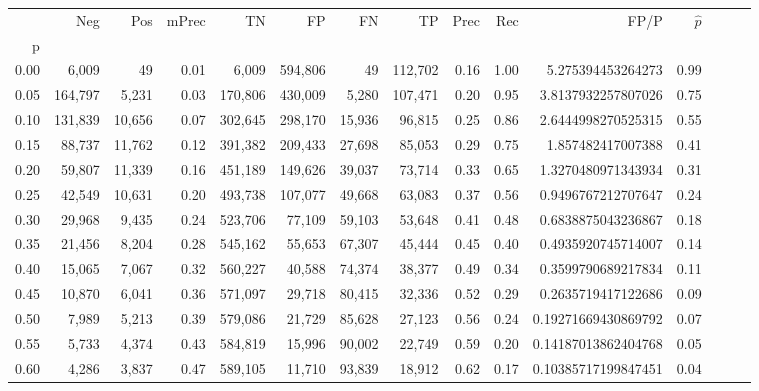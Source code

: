 \begin{tabular}{rrrrrrrrrrrrrrr}
\toprule
{} &      Neg &     Pos & mPrec &       TN &       FP &       FN &       TP &  Prec &   Rec &                  FP/P & $\hat{p}$ \\
p    &          &         &       &          &          &          &          &       &       &                       &           \\
\midrule
0.00 &    6,009 &      49 &  0.01 &    6,009 &  594,806 &       49 &  112,702 &  0.16 &  1.00 &     5.275394453264273 &      0.99 \\
0.05 &  164,797 &   5,231 &  0.03 &  170,806 &  430,009 &    5,280 &  107,471 &  0.20 &  0.95 &    3.8137932257807026 &      0.75 \\
0.10 &  131,839 &  10,656 &  0.07 &  302,645 &  298,170 &   15,936 &   96,815 &  0.25 &  0.86 &    2.6444998270525315 &      0.55 \\
0.15 &   88,737 &  11,762 &  0.12 &  391,382 &  209,433 &   27,698 &   85,053 &  0.29 &  0.75 &     1.857482417007388 &      0.41 \\
0.20 &   59,807 &  11,339 &  0.16 &  451,189 &  149,626 &   39,037 &   73,714 &  0.33 &  0.65 &    1.3270480971343934 &      0.31 \\
0.25 &   42,549 &  10,631 &  0.20 &  493,738 &  107,077 &   49,668 &   63,083 &  0.37 &  0.56 &    0.9496767212707647 &      0.24 \\
0.30 &   29,968 &   9,435 &  0.24 &  523,706 &   77,109 &   59,103 &   53,648 &  0.41 &  0.48 &    0.6838875043236867 &      0.18 \\
0.35 &   21,456 &   8,204 &  0.28 &  545,162 &   55,653 &   67,307 &   45,444 &  0.45 &  0.40 &    0.4935920745714007 &      0.14 \\
0.40 &   15,065 &   7,067 &  0.32 &  560,227 &   40,588 &   74,374 &   38,377 &  0.49 &  0.34 &    0.3599790689217834 &      0.11 \\
0.45 &   10,870 &   6,041 &  0.36 &  571,097 &   29,718 &   80,415 &   32,336 &  0.52 &  0.29 &    0.2635719417122686 &      0.09 \\
0.50 &    7,989 &   5,213 &  0.39 &  579,086 &   21,729 &   85,628 &   27,123 &  0.56 &  0.24 &   0.19271669430869792 &      0.07 \\
0.55 &    5,733 &   4,374 &  0.43 &  584,819 &   15,996 &   90,002 &   22,749 &  0.59 &  0.20 &   0.14187013862404768 &      0.05 \\
0.60 &    4,286 &   3,837 &  0.47 &  589,105 &   11,710 &   93,839 &   18,912 &  0.62 &  0.17 &   0.10385717199847451 &      0.04 \\

\end{tabular}
